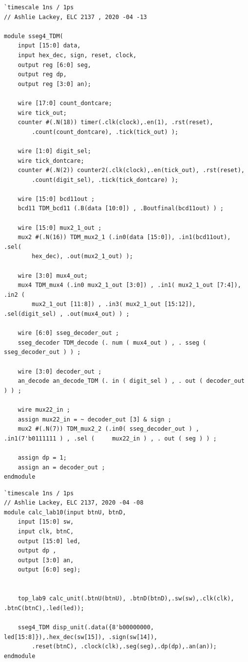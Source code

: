\documentclass[11pt]{article}
\begin{document}
\begin{lstlisting}[style=Verilog,caption= sseg4\_TDM Verilog Code,label=code:ex ]
`timescale 1ns / 1ps
// Ashlie Lackey, ELC 2137 , 2020 -04 -13

module sseg4_TDM(
	input [15:0] data,
	input hex_dec, sign, reset, clock,
	output reg [6:0] seg,
	output reg dp,
	output reg [3:0] an);
	
	wire [17:0] count_dontcare; 
	wire tick_out;
	counter #(.N(18)) timer(.clk(clock),.en(1), .rst(reset), 
		.count(count_dontcare), .tick(tick_out) );
	
	wire [1:0] digit_sel;
	wire tick_dontcare;
	counter #(.N(2)) counter2(.clk(clock),.en(tick_out), .rst(reset),
		.count(digit_sel), .tick(tick_dontcare) );
	
	wire [15:0] bcd11out ;
	bcd11 TDM_bcd11 (.B(data [10:0]) , .Boutfinal(bcd11out) ) ;
	
	wire [15:0] mux2_1_out ;
	mux2 #(.N(16)) TDM_mux2_1 (.in0(data [15:0]), .in1(bcd11out), .sel(
		hex_dec), .out(mux2_1_out) );
	
	wire [3:0] mux4_out;
	mux4 TDM_mux4 (.in0 mux2_1_out [3:0]) , .in1( mux2_1_out [7:4]), .in2 (
		mux2_1_out [11:8]) , .in3( mux2_1_out [15:12]), .sel(digit_sel) , .out(mux4_out) ) ;
	
	wire [6:0] sseg_decoder_out ;
	sseg_decoder TDM_decode (. num ( mux4_out ) , . sseg ( sseg_decoder_out ) ) ;
	
	wire [3:0] decoder_out ;
	an_decode an_decode_TDM (. in ( digit_sel ) , . out ( decoder_out ) ) ;
	
	wire mux22_in ;
	assign mux22_in = ~ decoder_out [3] & sign ;
	mux2 #(.N(7)) TDM_mux2_2 (.in0( sseg_decoder_out ) , .in1(7'b0111111 ) , .sel ( 	mux22_in ) , . out ( seg ) ) ;
	
	assign dp = 1;
	assign an = decoder_out ;
endmodule
\end{lstlisting}

\begin{lstlisting}[style=Verilog,caption= calc\_lab10 Verilog Code ,label=code:ex ]
`timescale 1ns / 1ps
// Ashlie Lackey, ELC 2137, 2020 -04 -08
module calc_lab10(input btnU, btnD,
	input [15:0] sw,
	input clk, btnC,
	output [15:0] led,
	output dp ,
	output [3:0] an,
	output [6:0] seg);
	
	
	top_lab9 calc_unit(.btnU(btnU), .btnD(btnD),.sw(sw),.clk(clk), .btnC(btnC),.led(led));
	
	sseg4_TDM disp_unit(.data({8'b00000000, led[15:8]}),.hex_dec(sw[15]), .sign(sw[14]),
		.reset(btnC), .clock(clk),.seg(seg),.dp(dp),.an(an));
endmodule
\end{lstlisting}
\end{document}
